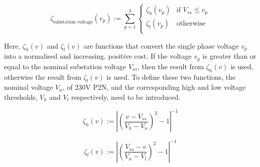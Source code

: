 \begin{equation}
	\zeta_\text{substation voltage}(v_{p}) := \sum_{p=1}^{3}{\begin{cases}
		\zeta_h(v_p) & \text{if } V_{ss} \leq v_p\\
		\zeta_l(v_p) & \text{otherwise}\\
	\end{cases}}
	\label{ch1:equ:substation-voltage-deviation}
\end{equation}

Here, $\zeta_h(v)$ and $\zeta_l(v)$ are functions that convert the single phase voltage $v_p$ into a normalised and increasing, positive cost.
If the voltage $v_p$ is greater than or equal to the nominal substation voltage $V_{ss}$, then the result from $\zeta_h(v)$ is used, otherwise the result from $\zeta_l(v)$ is used.
To define these two functions, the nominal voltage $V_n$, of 230V P2N, and the corresponding high and low voltage thresholds, $V_h$ and $V_l$ respectively, need to be introduced.

\begin{equation}
	\zeta_h(v) := \left|\left(\frac{v-V_{ss}}{V_h-V_n}\right)^2-1\right|^{-1}
	\label{ch:equ:high-voltage-threshold-cost}
\end{equation}

\begin{equation}
	\zeta_l(v) := \left|\left(\frac{V_{ss}-v}{V_n-V_l}\right)^2-1\right|^{-1}
	\label{ch:equ:low-voltage-threshold-cost}
\end{equation}